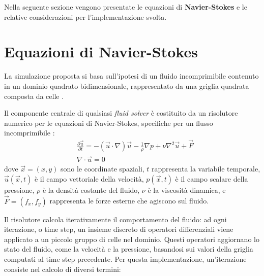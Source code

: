 \documentclass[12pt,a4paper,openany,twoside]{article}
\begin{document}
Nella seguente sezione vengono presentate le equazioni di \textbf{Navier-Stokes} e le relative considerazioni per l'implementazione svolta.

\section{Equazioni di Navier-Stokes}
La simulazione proposta si basa sull'ipotesi di un fluido incomprimibile contenuto in un dominio quadrato bidimensionale, rappresentato da una griglia quadrata composta da celle \cite{fernando2004gpu, 10.1145/311535.311548}.

Il componente centrale di qualsiasi \textit{fluid solver} è costituito da un risolutore numerico per le equazioni di Navier-Stokes, specifiche per un flusso incomprimibile \cite{chorin2013mathematical}:
\begin{align*}
	&\frac{\partial \vec{u}}{\partial t} = - (\vec{u} \cdot \nabla) \vec{u} - \frac{1}{\rho} \nabla p + \nu \nabla^2 \vec{u} + \vec{F} \\
	&\nabla \cdot \vec{u} = 0
\end{align*}
dove \(\vec{x} = (x,y)\) sono le coordinate spaziali, \(t\) rappresenta la variabile temporale, \(\vec{u}(\vec{x},t)\) è il campo vettoriale della velocità, \(p(\vec{x},t)\) è il campo scalare della pressione, \(\rho\) è la densità costante del fluido, \(\nu\) è la viscosità dinamica, e \(\vec{F} = (f_x,f_y)\) rappresenta le forze esterne che agiscono sul fluido.

Il risolutore calcola iterativamente il comportamento del fluido: ad ogni iterazione, o time step, un insieme discreto di operatori differenziali viene applicato a un piccolo gruppo di celle nel dominio. Questi operatori aggiornano lo stato del fluido, come la velocità e la pressione, basandosi sui valori della griglia computati al time step precedente. 
Per questa implementazione, un'iterazione consiste nel calcolo di diversi termini:
\end{document}
